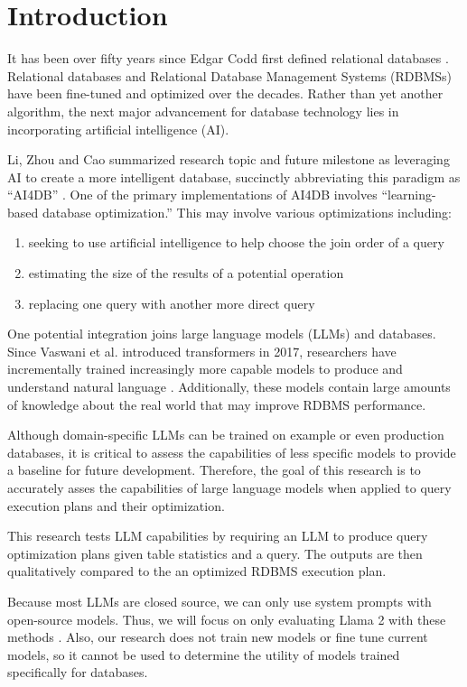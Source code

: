 \section{Introduction}
It has been over fifty years since Edgar Codd first defined relational databases \cite{codd1970}. Relational databases and Relational Database Management Systems (RDBMSs) have been fine-tuned and optimized over the decades. Rather than yet another algorithm, the next major advancement for database technology lies in incorporating artificial intelligence (AI).

Li, Zhou and Cao summarized research topic and future milestone as leveraging AI to create a more intelligent database, succinctly abbreviating this paradigm as ``AI4DB'' \cite{li2021}. One of the primary implementations of AI4DB involves ``learning-based database optimization.'' This may involve various optimizations including:

\begin{enumerate}
  \item seeking to use artificial intelligence to help choose the join order of a query
  \item estimating the size of the results of a potential operation
  \item replacing one query with another more direct query
\end{enumerate}

One potential integration joins large language models (LLMs) and databases. Since Vaswani et al. introduced transformers in 2017, researchers have incrementally trained increasingly more capable models to produce and understand natural language \cite{vaswani2017}. Additionally, these models contain large amounts of knowledge about the real world that may improve RDBMS performance.

Although domain-specific LLMs can be trained on example or even production databases, it is critical to assess the capabilities of less specific models to provide a baseline for future development. Therefore, the goal of this research is to accurately asses the capabilities of large language models when applied to query execution plans and their optimization.

This research tests LLM capabilities by requiring an LLM to produce query optimization plans given table statistics and a query. The outputs are then qualitatively compared to the an optimized RDBMS execution plan.

Because most LLMs are closed source, we can only use system prompts with open-source models. Thus, we will focus on only evaluating Llama 2 with these methods \cite{touvron2023}. Also, our research does not train new models or fine tune current models, so it cannot be used to determine the utility of models trained specifically for databases.


